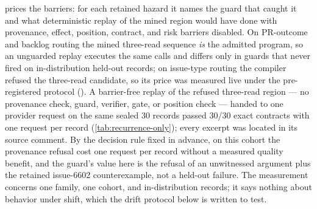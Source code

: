  prices the barriers: for each
retained hazard it names the guard that caught it and what deterministic replay
of the mined region would have done with provenance, effect, position,
contract, and risk barriers disabled. On PR-outcome and backlog routing the
mined three-read sequence \emph{is} the admitted program, so an unguarded
replay executes the same calls and differs only in guards that never fired on
in-distribution held-out records; on issue-type routing the compiler refused
the three-read candidate, so its price was measured live under the
pre-registered protocol
(). A
barrier-free replay of the refused three-read region --- no provenance check,
guard, verifier, gate, or position check --- handed to one provider request on
the same sealed 30 records passed 30/30 exact contracts with one request per
record (\cref{tab:recurrence-only}); every excerpt was located in its source
comment. By the decision rule fixed in advance, on this cohort the provenance
refusal cost one request per record without a measured quality benefit, and the
guard's value here is the refusal of an unwitnessed argument plus the retained
issue-6602 counterexample, not a held-out failure. The measurement concerns one
family, one cohort, and in-distribution records; it says nothing about
behavior under shift, which the drift protocol below is written to test.


